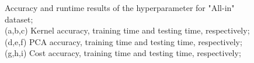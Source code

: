 \documentclass[conference]{IEEEtran}
\begin{document}
\begin{figure}[ht!]
    \quad
    \quad
    \quad

    \caption{
        \color{maxim}
        Accuracy and runtime results of the hyperparameter for "All-in" dataset; \\ 
        (a,b,c) Kernel accuracy, training time and testing time, respectively; (d,e,f) PCA accuracy, training time and testing time, respectively; (g,h,i) Cost accuracy, training time and testing time, respectively;
    }
    \label{fig:hyper:svm_param_allin}
\end{figure}
\end{document}
